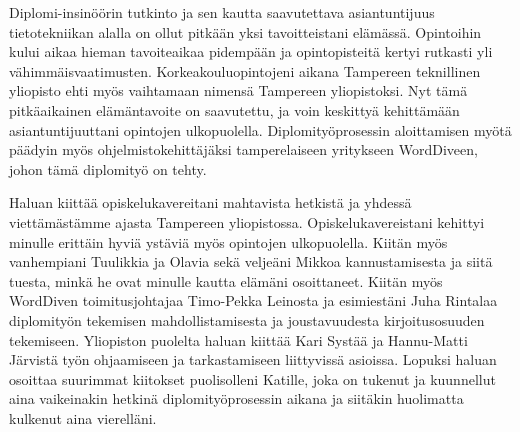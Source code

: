 Diplomi-insinöörin tutkinto ja sen kautta saavutettava asiantuntijuus tietotekniikan alalla on ollut pitkään yksi tavoitteistani elämässä.
Opintoihin kului aikaa hieman tavoiteaikaa pidempään ja opintopisteitä kertyi rutkasti yli vähimmäisvaatimusten.
Korkeakouluopintojeni aikana Tampereen teknillinen yliopisto ehti myös vaihtamaan nimensä Tampereen yliopistoksi.
Nyt tämä pitkäaikainen elämäntavoite on saavutettu, ja voin keskittyä kehittämään asiantuntijuuttani opintojen ulkopuolella.
Diplomityöprosessin aloittamisen myötä päädyin myös ohjelmistokehittäjäksi tamperelaiseen yritykseen WordDiveen, johon tämä diplomityö on tehty.

Haluan kiittää opiskelukavereitani mahtavista hetkistä ja yhdessä viettämästämme ajasta Tampereen yliopistossa.
Opiskelukavereistani kehittyi minulle erittäin hyviä ystäviä myös opintojen ulkopuolella.
Kiitän myös vanhempiani Tuulikkia ja Olavia sekä veljeäni Mikkoa kannustamisesta ja siitä tuesta, minkä he ovat minulle kautta elämäni osoittaneet.
Kiitän myös WordDiven toimitusjohtajaa Timo-Pekka Leinosta ja esimiestäni Juha Rintalaa diplomityön tekemisen mahdollistamisesta ja joustavuudesta kirjoitusosuuden tekemiseen.
Yliopiston puolelta haluan kiittää Kari Systää ja Hannu-Matti Järvistä työn ohjaamiseen ja tarkastamiseen liittyvissä asioissa.
Lopuksi haluan osoittaa suurimmat kiitokset puolisolleni Katille, joka on tukenut ja kuunnellut aina vaikeinakin hetkinä diplomityöprosessin aikana ja siitäkin huolimatta kulkenut aina vierelläni.
